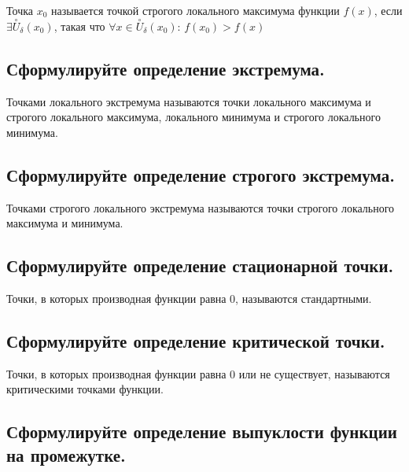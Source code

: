 Точка $x_0$ называется точкой строгого локального максимума функции $f(x)$, если $\exists \overset{\circ}{U}_\delta(x_0)$, такая что $\forall x \in \overset{\circ}{U}_\delta(x_0)$: $f(x_0) > f(x)$



\subsection{Сформулируйте определение экстремума.}

Точками локального экстремума называются точки локального максимума и строгого локального максимума, локального минимума и строгого локального минимума.



\subsection{Сформулируйте определение строгого экстремума.}

Точками строгого локального экстремума называются точки строгого локального максимума и минимума.



\subsection{Сформулируйте определение стационарной точки.}

Точки, в которых производная функции равна 0, называются стандартными.



\subsection{Сформулируйте определение критической точки.}

Точки, в которых производная функции равна 0 или не существует, называются критическими точками функции.



\subsection{Сформулируйте определение выпуклости функции на промежутке.}

